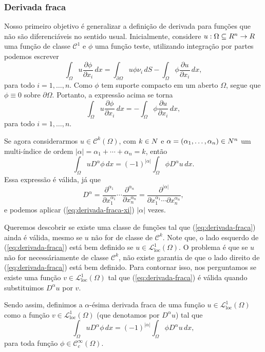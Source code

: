 \documentclass[xcolor=dvipsnames, aspectratio=169, 10pt]{beamer}
\let\mathbb\relax
\newcommand{\bN}{\mathbb{N}}
\newcommand{\bR}{\mathbb{R}}
\newcommand{\cC}{\mathcal{C}}
\newcommand{\cL}{\mathcal{L}}
\newcommand{\loc}{\mathrm{loc}}
\begin{document}
\begin{frame}
    \frametitle{Derivada fraca}
    Nosso primeiro objetivo é generalizar a definição de derivada para funções que não são diferenciáveis no sentido usual. \pause
    Inicialmente, considere $u : \Omega \subseteq \bR^n \to \bR$ uma função de classe $\cC^1$ e $\phi$ uma função teste, utilizando integração por partes podemos escrever
    \[
        \int_{\Omega} u \frac{\partial \phi}{\partial x_i} \,dx = \int_{\partial \Omega} u \phi \nu_i \,dS - \int_{\Omega} \phi \frac{\partial u}{\partial x_i} \,dx,
    \]
    para todo $i = 1,\dots,n$. \pause
    Como $\phi$ tem suporte compacto em um aberto $\Omega$, segue que $\phi \equiv 0$ sobre $\partial \Omega$. Portanto, a expressão acima se torna
    \begin{equation} \label{eq:derivada-fraca-xi}
        \int_{\Omega} u \frac{\partial \phi}{\partial x_i} \,dx = -\int_{\Omega} \phi \frac{\partial u}{\partial x_i} \,dx,
    \end{equation}
    para todo $i = 1,\dots,n$.
\end{frame}
\begin{frame}
    Se agora considerarmos $u \in \cC^k(\Omega)$, com $k \in \bN$ e $\alpha = (\alpha_1,\dots,\alpha_n) \in \bN^n$ um multi-índice de ordem $|\alpha| = \alpha_1 + \cdots + \alpha_n = k$, então
    \begin{equation} \label{eq:derivada-fraca}
        \int_{\Omega} u D^{\alpha} \phi \,dx = (-1)^{|\alpha|} \int_{\Omega} \phi D^{\alpha} u \,dx.
    \end{equation}
    Essa expressão é válida, já que
    \[
        D^{\alpha} = \dfrac{\partial^{\alpha_1} }{\partial x_1^{\alpha_1}} \cdots \dfrac{\partial^{\alpha_n} }{\partial x_n^{\alpha_n}} = \dfrac{\partial^{|\alpha|} }{\partial x_1^{\alpha_1} \cdots \partial x_n^{\alpha_n}},
    \]
    e podemos aplicar (\ref{eq:derivada-fraca-xi}) $|\alpha|$ vezes.
\end{frame}
\begin{frame}
    Queremos descobrir se existe uma classe de funções tal que (\ref{eq:derivada-fraca}) ainda é válida, mesmo se $u$ não for de classe de $\cC^k$. \pause
    Note que, o lado esquerdo de (\ref{eq:derivada-fraca}) está bem definido se $u \in \cL^1_{\loc}(\Omega)$. \pause
    O problema é que se $u$ não for necessáriamente de classe $\cC^k$, não existe garantia de que o lado direito de (\ref{eq:derivada-fraca}) está bem definido.
    Para contornar isso, nos perguntamos se existe uma função $v \in \cL^1_{\loc}(\Omega)$ tal que (\ref{eq:derivada-fraca}) é válida quando substituimos $D^{\alpha} u$ por $v$. \pause

    Sendo assim, definimos a $\alpha$-ésima derivada fraca de uma função $u \in \cL^1_{\loc}(\Omega)$ como a função $v \in \cL^1_{\loc}(\Omega)$ (que denotamos por $D^\alpha u$) tal que
    \[
        \int_{\Omega} u D^\alpha \phi \,dx = (-1)^{|\alpha|} \int_{\Omega} \phi D^\alpha u\,dx,
    \]
    para toda função $\phi \in \cC^{\infty}_c(\Omega)$.
\end{frame}
\end{document}
